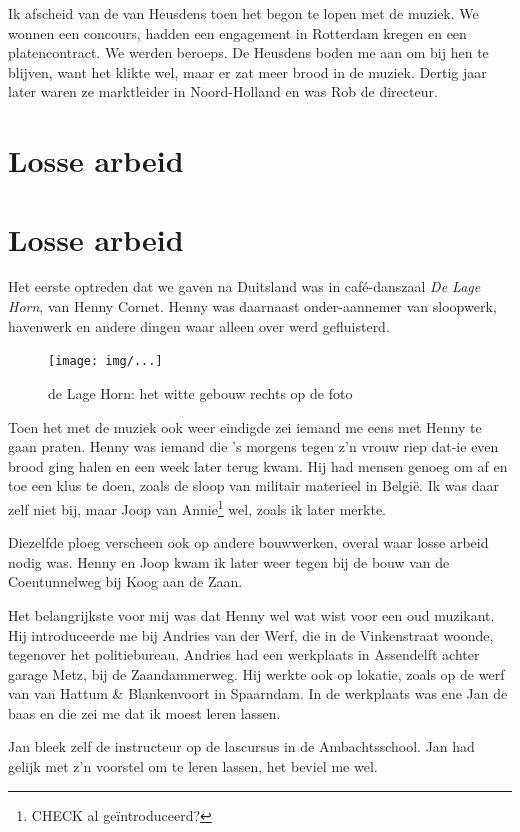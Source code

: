 \documentclass[12pt,twoside, openright]{memoir}
\begin{document}
Ik afscheid van de van Heusdens toen het begon te lopen met de muziek. We wonnen een concours, hadden een engagement in Rotterdam kregen en een platencontract. We werden beroeps. De Heusdens boden me aan om bij hen te blijven, want het klikte wel, maar er zat meer brood in de muziek. Dertig jaar later waren ze marktleider in Noord-Holland en was Rob de directeur.

\chapter{Losse arbeid} %
\label{cha:lossearbeid}


\chapter{Losse arbeid} %
\label{cha:lossearbeid}

Het eerste optreden dat we gaven na Duitsland was in café-danszaal \emph{De Lage Horn}, van Henny Cornet. Henny was daarnaast onder-aannemer van sloopwerk, havenwerk en andere dingen waar alleen over werd gefluisterd. 

\begin{figure}[t]
\texttt{[image: img/...]}
\caption{de Lage Horn: het witte gebouw rechts op de foto}
\end{figure}

Toen het met de muziek ook weer eindigde zei iemand me eens met Henny te gaan praten. Henny was iemand die ’s morgens tegen z’n vrouw riep dat-ie even brood ging halen en een week later terug kwam. Hij had mensen genoeg om af en toe een klus te doen, zoals de sloop van militair materieel in België. Ik was daar zelf niet bij, maar Joop van Annie\footnote{CHECK al geïntroduceerd?} wel, zoals ik later merkte. 

Diezelfde ploeg verscheen ook op andere bouwwerken, overal waar losse arbeid nodig was. Henny en Joop kwam ik later weer tegen bij de bouw van de Coentunnelweg bij Koog aan de Zaan. 

Het belangrijkste voor mij was dat Henny wel wat wist voor een oud muzikant. Hij introduceerde me bij Andries van der Werf, die in de Vinkenstraat woonde, tegenover het politiebureau. Andries had een werkplaats in Assendelft achter garage Metz, bij de Zaandammerweg. Hij werkte ook op lokatie, zoals op de werf van van Hattum \& Blankenvoort in Spaarndam. In de werkplaats was ene Jan de baas en die zei me dat ik moest leren lassen. 

Jan bleek zelf de instructeur op de lascursus in de Ambachtsschool. Jan had gelijk met z’n voorstel om te leren lassen, het beviel me wel.
\end{document}

